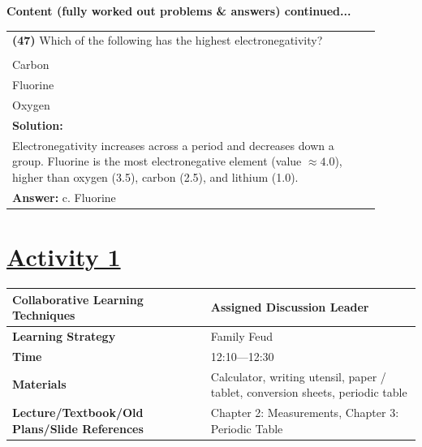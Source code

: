 \documentclass{article}
\begin{document}
\noindent
{\large\textbf{Content (fully worked out problems \& answers) continued...}}\\[0.2em]
\vspace{0.2cm}
\begin{tabular}{|p{0.9\linewidth}|}
\hline
\vspace{0.2cm}
\textbf{(47)} Which of the following has the highest electronegativity? \\
\begin{minipage}[t]{0.85\linewidth}
\begin{enumerate}[label=\alph*.]
\item Lithium \\
\item Carbon \\
\item Fluorine \\
\item Oxygen
\end{enumerate}
\end{minipage}\\
\hline
\vspace{0.2cm}
\textbf{Solution:} \\
Electronegativity increases across a period and decreases down a group. Fluorine is the most electronegative element (value $\approx 4.0$), higher than oxygen (3.5), carbon (2.5), and lithium (1.0). \\
\hline
\vspace{0.2cm}
\textbf{Answer:} c. Fluorine \\
\hline
\end{tabular}
\newpage

\section*{\underline{Activity 1}}
\vspace{0.2cm}
\begin{tabular}{|p{4.2cm}|p{9.8cm}|}
\hline
\textbf{Collaborative Learning Techniques} & Assigned Discussion Leader\\
\hline
\textbf{Learning Strategy} & Family Feud \\
\hline
\textbf{Time} & 12:10---12:30\\
\hline
\textbf{Materials} & Calculator, writing utensil, paper / tablet, conversion sheets, periodic table \\
\hline
\textbf{Lecture/Textbook/Old Plans/Slide References} & Chapter 2: Measurements, Chapter 3: Periodic Table\\
\hline
\end{tabular}
\end{document}
